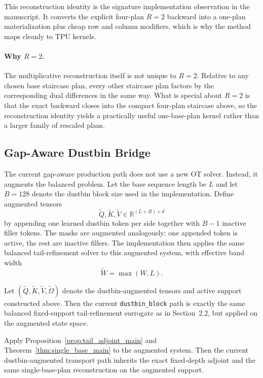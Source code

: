 This reconstruction identity is the signature implementation observation in the manuscript. It converts the explicit four-plan $R=2$ backward into a one-plan materialization plus cheap row and column modifiers, which is why the method maps cleanly to TPU kernels.

\paragraph{Why \texorpdfstring{$R=2$}{R=2}.}
The multiplicative reconstruction itself is not unique to $R=2$. Relative to any chosen base staircase plan, every other staircase plan factors by the corresponding dual differences in the same way. What is special about $R=2$ is that the exact backward closes into the compact four-plan staircase above, so the reconstruction identity yields a practically useful one-base-plan kernel rather than a larger family of rescaled plans.

\subsection{Gap-Aware Dustbin Bridge}

The current gap-aware production path does not use a new OT solver. Instead, it augments the balanced problem. Let the base sequence length be $L$ and let $B=128$ denote the dustbin block size used in the implementation. Define augmented tensors
\[
\widetilde Q,\widetilde K,\widetilde V \in \mathbb{R}^{(L+B)\times d}
\]
by appending one learned dustbin token per side together with $B-1$ inactive filler tokens. The masks are augmented analogously: one appended token is active, the rest are inactive fillers. The implementation then applies the same balanced tail-refinement solver to this augmented system, with effective band width
\[
\widetilde W = \max(W,L).
\]

\begin{proposition}\label{thm:dustbin_aug}
Let $(\widetilde Q,\widetilde K,\widetilde V,\widetilde\Omega)$ denote the dustbin-augmented tensors and active support constructed above. Then the current \texttt{dustbin\_block} path is exactly the same balanced fixed-support tail-refinement surrogate as in Section~2.2, but applied on the augmented state space.
\end{proposition}

\begin{corollary}[Exact \texorpdfstring{$R=2$}{R=2} Adjoint on the Augmented State Space]\label{cor:dustbin_r2}
Apply Proposition~\ref{prop:tail_adjoint_main} and Theorem~\ref{thm:single_base_main} to the augmented system. Then the current dustbin-augmented transport path inherits the exact fixed-depth adjoint and the same single-base-plan reconstruction on the augmented support.
\end{corollary}

